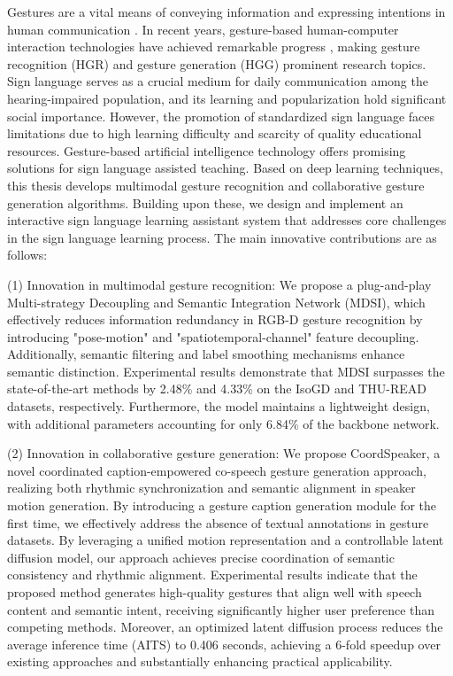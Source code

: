 \begin{abstract*}
Gestures are a vital means of conveying information and expressing intentions in human communication \cite{guo2021human}. In recent years, gesture-based human-computer interaction technologies have achieved remarkable progress \cite{伍杰2019基于视觉的实时手势识别方法研究, desai2017human,strickland2013using}, making gesture recognition (HGR) and gesture generation (HGG) prominent research topics. 
  Sign language serves as a crucial medium for daily communication among the hearing-impaired population, and its learning and popularization hold significant social importance. However, the promotion of standardized sign language faces limitations due to high learning difficulty and scarcity of quality educational resources. Gesture-based artificial intelligence technology offers promising solutions for sign language assisted teaching. Based on deep learning techniques, this thesis develops multimodal gesture recognition and collaborative gesture generation algorithms. Building upon these, we design and implement an interactive sign language learning assistant system that addresses core challenges in the sign language learning process. The main innovative contributions are as follows:

(1) Innovation in multimodal gesture recognition: We propose a plug-and-play Multi-strategy Decoupling and Semantic Integration Network (MDSI), which effectively reduces information redundancy in RGB-D gesture recognition by introducing "pose-motion" and "spatiotemporal-channel" feature decoupling. Additionally, semantic filtering and label smoothing mechanisms enhance semantic distinction. Experimental results demonstrate that MDSI surpasses the state-of-the-art methods by 2.48\% and 4.33\% on the IsoGD and THU-READ datasets, respectively. Furthermore, the model maintains a lightweight design, with additional parameters accounting for only 6.84\% of the backbone network.

(2) Innovation in collaborative gesture generation: We propose CoordSpeaker, a novel coordinated caption-empowered co-speech gesture generation approach, realizing both rhythmic synchronization and semantic alignment in speaker motion generation. By introducing a gesture caption generation module for the first time, we effectively address the absence of textual annotations in gesture datasets. By leveraging a unified motion representation and a controllable latent diffusion model, our approach achieves precise coordination of semantic consistency and rhythmic alignment. Experimental results indicate that the proposed method generates high-quality gestures that align well with speech content and semantic intent, receiving significantly higher user preference than competing methods. Moreover, an optimized latent diffusion process reduces the average inference time (AITS) to 0.406 seconds, achieving a 6-fold speedup over existing approaches and substantially enhancing practical applicability.


\end{abstract*}

